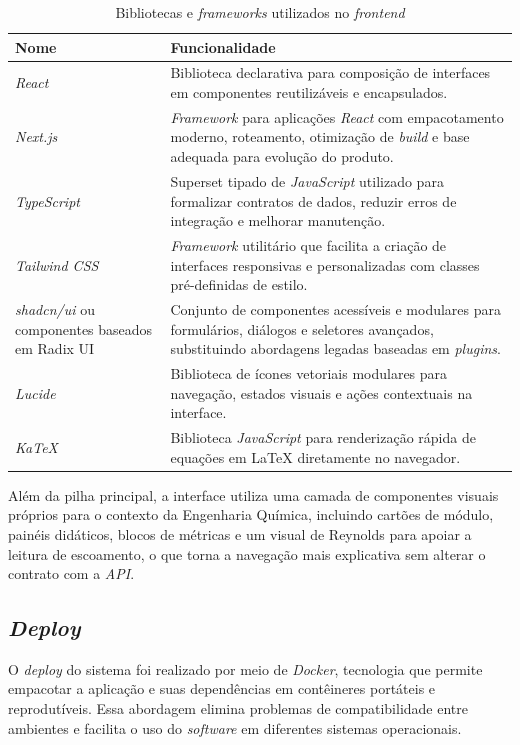 \begin{table}[H]
\centering
\caption{Bibliotecas e \textit{frameworks} utilizados no \textit{frontend}}
\label{tab:frontend_libs}
\begin{tabular}{|>{\raggedright\arraybackslash}p{}|>{\raggedright\arraybackslash}p{}|}
\hline
\textbf{Nome} & \textbf{Funcionalidade} \\ \hline
\textit{React} & Biblioteca declarativa para composição de interfaces em componentes reutilizáveis e encapsulados. \\ \hline
\textit{Next.js} & \textit{Framework} para aplicações \textit{React} com empacotamento moderno, roteamento, otimização de \textit{build} e base adequada para evolução do produto. \\ \hline
\textit{TypeScript} & Superset tipado de \textit{JavaScript} utilizado para formalizar contratos de dados, reduzir erros de integração e melhorar manutenção. \\ \hline
\textit{Tailwind CSS} & \textit{Framework} utilitário que facilita a criação de interfaces responsivas e personalizadas com classes pré-definidas de estilo. \\ \hline
\textit{shadcn/ui} ou componentes baseados em Radix UI & Conjunto de componentes acessíveis e modulares para formulários, diálogos e seletores avançados, substituindo abordagens legadas baseadas em \textit{plugins}. \\ \hline
\textit{Lucide} & Biblioteca de ícones vetoriais modulares para navegação, estados visuais e ações contextuais na interface. \\ \hline
\textit{KaTeX} & Biblioteca \textit{JavaScript} para renderização rápida de equações em \LaTeX{} diretamente no navegador. \\ \hline
\end{tabular}
\end{table}

Além da pilha principal, a interface utiliza uma camada de componentes visuais próprios para o contexto da Engenharia Química, incluindo cartões de módulo, painéis didáticos, blocos de métricas e um visual de Reynolds para apoiar a leitura de escoamento, o que torna a navegação mais explicativa sem alterar o contrato com a \textit{API}.

\subsection{\textit{Deploy}}
O \textit{deploy} do sistema foi realizado por meio de \textit{Docker}, tecnologia que permite empacotar a aplicação e suas dependências em contêineres portáteis e reprodutíveis. Essa abordagem elimina problemas de compatibilidade entre ambientes e facilita o uso do \textit{software} em diferentes sistemas operacionais.

